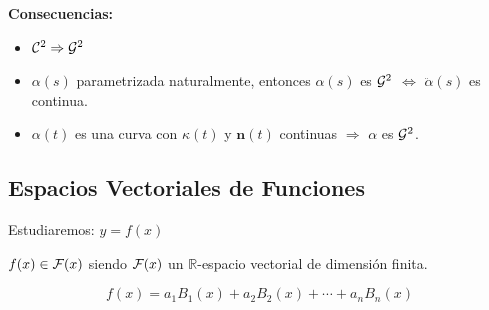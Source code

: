\documentclass[twoside]{report}
\begin{document}
{\bf Consecuencias:}
\begin{itemize}
\item ${\cal C}^2 \Rightarrow {\cal G}^2$
\item $\alpha(s)$ parametrizada naturalmente, entonces $\alpha(s)$ es ${\cal G}^2$ $\Leftrightarrow$  $\ddot{\alpha}(s)$ es continua.
\item $\alpha(t)$ es una curva con $\kappa(t)$ y $\mathbf{n}(t)$ continuas $\Rightarrow$ $\alpha$ es ${\cal G}^2$.

\end{itemize}

\subsection{Espacios Vectoriales de Funciones}

Estudiaremos: $y=f(x)$

\vspace{0.5cm}

$f(x)\in {\cal F}(x)$ siendo ${\cal F}(x)$ un $\mathbb{R}$-espacio vectorial de dimensi\'{o}n finita.

$$f(x)=a_1 B_1(x)+a_2 B_2(x)+\cdots+a_n B_n(x)$$

%
%
%
%
%
%
%
%
\end{document}
